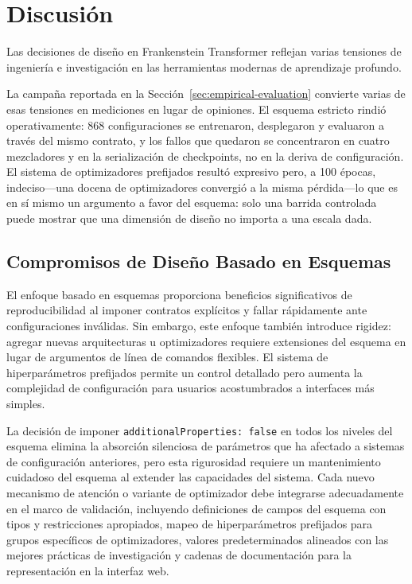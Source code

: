 \section{Discusión}
\label{sec:discussion}

Las decisiones de diseño en Frankenstein Transformer reflejan varias tensiones de ingeniería e investigación en las herramientas modernas de aprendizaje profundo.

La campaña reportada en la Sección~\ref{sec:empirical-evaluation} convierte varias de esas tensiones en mediciones en lugar de opiniones. El esquema estricto rindió operativamente: 868 configuraciones se entrenaron, desplegaron y evaluaron a través del mismo contrato, y los fallos que quedaron se concentraron en cuatro mezcladores y en la serialización de checkpoints, no en la deriva de configuración. El sistema de optimizadores prefijados resultó expresivo pero, a 100 épocas, indeciso---una docena de optimizadores convergió a la misma pérdida---lo que es en sí mismo un argumento a favor del esquema: solo una barrida controlada puede mostrar que una dimensión de diseño no importa a una escala dada.

\subsection{Compromisos de Diseño Basado en Esquemas}

El enfoque basado en esquemas proporciona beneficios significativos de reproducibilidad al imponer contratos explícitos y fallar rápidamente ante configuraciones inválidas. Sin embargo, este enfoque también introduce rigidez: agregar nuevas arquitecturas u optimizadores requiere extensiones del esquema en lugar de argumentos de línea de comandos flexibles. El sistema de hiperparámetros prefijados permite un control detallado pero aumenta la complejidad de configuración para usuarios acostumbrados a interfaces más simples.

La decisión de imponer \texttt{additionalProperties: false} en todos los niveles del esquema elimina la absorción silenciosa de parámetros que ha afectado a sistemas de configuración anteriores, pero esta rigurosidad requiere un mantenimiento cuidadoso del esquema al extender las capacidades del sistema. Cada nuevo mecanismo de atención o variante de optimizador debe integrarse adecuadamente en el marco de validación, incluyendo definiciones de campos del esquema con tipos y restricciones apropiados, mapeo de hiperparámetros prefijados para grupos específicos de optimizadores, valores predeterminados alineados con las mejores prácticas de investigación y cadenas de documentación para la representación en la interfaz web.

